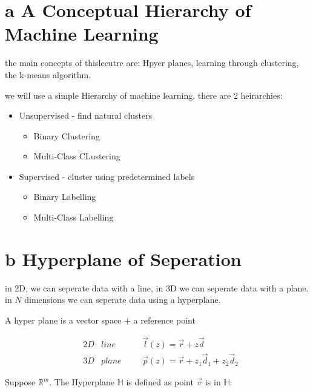 \documentclass[12pt]{book}
\title{\coursetitle\linebreak\lecturename}
\author{\\Cain Susko\\ 
           \\ \\ \\
      Queen's University 
    \\School of Computing\\}
\begin{document}
\begin{titlepage}
        \maketitle
\end{titlepage}


\section*{a A Conceptual Hierarchy of Machine Learning}
the main concepts of thislecutre are:
Hpyer planes, learning through clustering, the k-means algorithm.

we will use a simple Hierarchy of machine learning. there are 2 heirarchies:
\begin{itemize}
        \item Unsupervised - find natural clusters
                \begin{itemize}
                        \item Binary Clustering
                        \item Multi-Class CLustering
                \end{itemize}
        \item Supervised - cluster using predetermined labels
                \begin{itemize}
                        \item Binary Labelling
                        \item Multi-Class Labelling
                \end{itemize}
\end{itemize}

\section*{b Hyperplane of Seperation}
in 2D, we can seperate data with a line, in 3D we can seperate data with a plane. in $N$ dimensions we can seperate data using a 
hyperplane.

A hyper plane is a vector space + a reference point

\begin{align*}
        &2D &line\;\;\;\;\;\;&\vec l(z) = \vec r + z\vec d\\
        &3D &plane\;\;\;\;\;\;&\vec p(z) = \vec r + z_1\vec d_1 + z_2\vec d_2 
\end{align*}

Suppose $\mathbb{R}^m$. The Hyperplane $\mathbb{H}$ is defined as point $\vec v$ is in $\mathbb{H}$:
\end{document}
